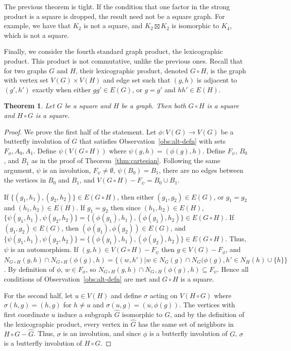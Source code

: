 \documentclass{article}
\newtheorem{theorem}{Theorem}[section]
\theoremstyle{definition}
\begin{document}
The previous theorem is tight. If the condition that one factor in the strong product is a square is dropped, the result need not be a square graph. For example, we have that $K_2$ is not a square, and $K_2\boxtimes K_2$ is isomorphic to $K_4$, which is not a square.

Finally, we consider the fourth standard graph product, the lexicographic product. This product is not commutative, unlike the previous ones. Recall that for two graphs $G$ and $H$, their lexicographic product, denoted $G \circ H$, is the graph with vertex set $V(G) \times V(H)$ and edge set such that $(g,h)$ is adjacent to $(g',h')$ exactly when either $gg' \in E(G)$, or $g=g'$ and $hh' \in E(H)$.

\begin{theorem} \label{thm:lexicographic}
 Let $G$ be a square and $H$ be a graph. Then both $G\circ H$ is a square and $H\circ G$ is a square.
\end{theorem}

\begin{proof}
We prove the first half of the statement. Let $\phi:V(G)\rightarrow V(G)$ be a butterfly involution of $G$ that satisfies Observation~\ref{obs:alt-defn} with sets $F_{\phi}, A_0, A_1$. Define $\psi(V(G \circ H))$ where $\psi(g,h) = (\phi(g), h)$. Define $F_{\psi}$,  $B_0$, and $B_1$ as in the proof of Theorem~\ref{thm:cartesian}. Following the same argument, $\psi$ is an involution, $F_{\psi} \ne \emptyset$, $\psi(B_0)=B_1$, there are no edges between the vertices in $B_0$ and $B_1$, and $V(G\circ H)-F_{\psi}=B_0\cup B_1$.

If $\{(g_1,h_1), (g_2,h_2)\} \in E(G \circ H)$, then either  $(g_1,g_2) \in E(G)$, or $g_1 = g_2$ and $(h_1,h_2) \in E(H)$. If $g_1 = g_2$ then since $(h_1,h_2) \in E(H)$, $\{\psi(g_1,h_1), \psi(g_2,h_2)\} = \{(\phi(g_1),h_1), (\phi(g_1),h_2)\} \in E(G \circ H)$.  If  $(g_1,g_2) \in E(G)$, then  $(\phi(g_1),\phi(g_2)) \in E(G)$, and $\{\psi(g_1,h_1), \psi(g_2,h_2)\} = \{(\phi(g_1),h_1), (\phi(g_2),h_2)\} \in E(G \circ H)$.   Thus, $\psi$ is an automorphism. If $(g,h) \in V(G \circ H) - F_{\psi}$ then $g \in V(G) - F_{\phi}$, and $N_{G\circ H}(g,h) \cap N_{G\circ H}(\phi(g),h) = \{(w,h') | w \in N_G(g) \cap N_G (\phi(g), h' \in N_H(h)\cup\{h\} \}$. By definition of $\phi$, $w \in F_{\phi}$, so  $N_{G\circ H}(g,h) \cap N_{G\circ H}(\phi(g),h) \subseteq F_{\psi}$. Hence all conditions of Observation~\ref{obs:alt-defn} are met and $G\circ H$ is a square. 

For the second half, let $u\in V(H)$ and define $\sigma$ acting on $ V(H \circ G)$ where $\sigma(h,g) = (h,g)$ for $h\neq u$ and $\sigma(u,g) = (u,\phi(g))$. The vertices with first coordinate $u$ induce a subgraph $\hat{G}$ isomorphic to $G$, and by the definition of the lexicographic product, every vertex in $\hat{G}$ has the same set of neighbors in $H\circ G-\hat{G}$. Thus, $\sigma$ is an involution, and since $\phi$ is a butterfly involution of $G$, $\sigma$ is a butterfly involution of $H\circ G$. 
\end{proof}
\end{document}

